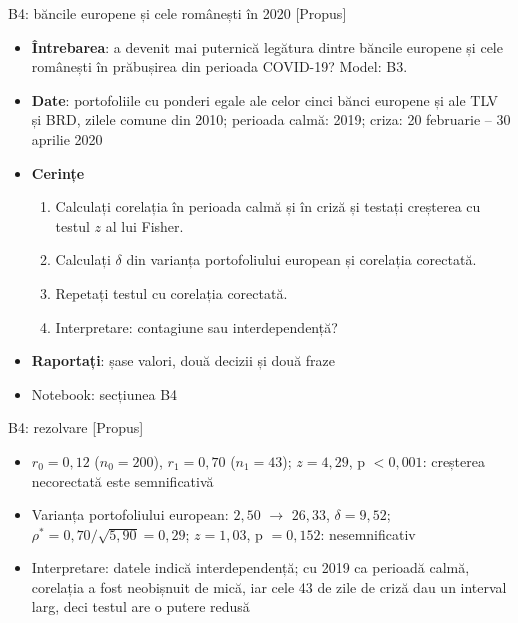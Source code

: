 \begin{frame}{B4: băncile europene și cele românești în 2020 [Propus]}
\itemsize{\footnotesize}
\begin{itemize}
\item \textbf{Întrebarea}: a devenit mai puternică legătura dintre băncile europene și cele românești în prăbușirea din perioada COVID-19? Model: B3.
\item \textbf{Date}: portofoliile cu ponderi egale ale celor cinci bănci europene și ale TLV și BRD, zilele comune din 2010; perioada calmă: 2019; criza: 20 februarie -- 30 aprilie 2020
\item \textbf{Cerințe}
\begin{enumerate}
    \item Calculați corelația în perioada calmă și în criză și testați creșterea cu testul $z$ al lui Fisher.
    \item Calculați $\delta$ din varianța portofoliului european și corelația corectată.
    \item Repetați testul cu corelația corectată.
    \item Interpretare: contagiune sau interdependență?
\end{enumerate}
\item \textbf{Raportați}: șase valori, două decizii și două fraze
\item Notebook: secțiunea B4
\end{itemize}
\end{frame}

\ifsolutions
\begin{frame}{B4: rezolvare [Propus]}
\itemsize{\footnotesize}
\begin{itemize}
    \item $r_0 = 0{,}12$ ($n_0 = 200$), $r_1 = 0{,}70$ ($n_1 = 43$); $z = 4{,}29$, p $< 0{,}001$: creșterea necorectată este semnificativă
    \item Varianța portofoliului european: $2{,}50$ $\to$ $26{,}33$, $\delta = 9{,}52$; $\rho^* = 0{,}70/\sqrt{5{,}90} = 0{,}29$; $z = 1{,}03$, p $= 0{,}152$: nesemnificativ
    \item Interpretare: datele indică interdependență; cu 2019 ca perioadă calmă, corelația a fost neobișnuit de mică, iar cele 43 de zile de criză dau un interval larg, deci testul are o putere redusă
\end{itemize}
\end{frame}
\fi

